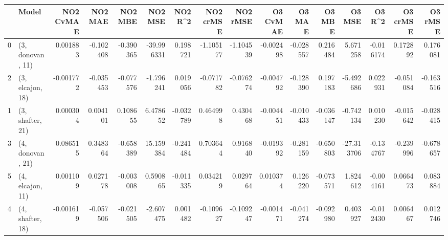\begin{tabular}{llrrrrrrrrrrrrrr}
\toprule
{} &             Model &  NO2 CvMAE &   NO2 MAE &   NO2 MBE &    NO2 MSE &   NO2 R\textasciicircum2 &  NO2 crMSE &  NO2 rMSE &  O3 CvMAE &    O3 MAE &    O3 MBE &     O3 MSE &    O3 R\textasciicircum2 &  O3 crMSE &   O3 rMSE \\
\midrule
0 &  (3, donovan, 11) &   0.001883 & -0.102408 & -0.390365 & -39.996331 &  0.198721 &  -1.105177 & -1.104539 & -0.002498 & -0.028557 &  0.216484 &   5.671258 & -0.016174 &  0.172892 &  0.176081 \\
2 &  (3, elcajon, 18) &  -0.001772 & -0.035453 & -0.077576 &  -1.796241 &  0.019056 &  -0.071782 & -0.076274 & -0.004792 & -0.128390 &  0.197183 &  -5.492686 &  0.022931 & -0.051084 & -0.163516 \\
1 &  (3, shafter, 21) &   0.000304 &  0.004101 &  0.108655 &   6.478652 & -0.032789 &   0.464998 &  0.430468 & -0.004451 & -0.010433 & -0.036147 &  -0.742134 &  0.010230 & -0.015642 & -0.028415 \\
3 &  (4, donovan, 21) &   0.086515 &  0.348364 & -0.658389 &  15.159384 & -0.241484 &   0.703644 &  0.916840 & -0.019392 & -0.281159 & -0.650803 & -27.313706 & -0.134767 & -0.239996 & -0.678657 \\
5 &  (4, elcajon, 11) &   0.001109 &  0.027178 & -0.003008 &   0.590865 & -0.011335 &   0.034219 &  0.029764 &  0.010374 &  0.126220 & -0.073571 &   1.824612 & -0.004161 &  0.066473 &  0.083884 \\
4 &  (4, shafter, 18) &  -0.001619 & -0.057506 & -0.021505 &  -2.607475 &  0.001482 &  -0.109627 & -0.109247 & -0.001471 & -0.041274 & -0.092980 &   0.403927 & -0.012430 &  0.006467 &  0.012746 \\
\bottomrule
\end{tabular}
